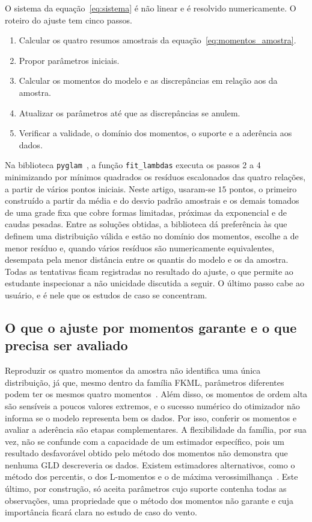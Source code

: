 O sistema da equação~\eqref{eq:sistema} é não linear e é resolvido numericamente. O roteiro do ajuste tem cinco passos.
\begin{enumerate}
    \item Calcular os quatro resumos amostrais da equação~\eqref{eq:momentos_amostra}.
    \item Propor parâmetros iniciais.
    \item Calcular os momentos do modelo e as discrepâncias em relação aos da amostra.
    \item Atualizar os parâmetros até que as discrepâncias se anulem.
    \item Verificar a validade, o domínio dos momentos, o suporte e a aderência aos dados.
\end{enumerate}
Na biblioteca \texttt{pyglam}~\cite{pyglam}, a função \texttt{fit\_lambdas} executa os passos 2 a 4 minimizando por mínimos quadrados os resíduos escalonados das quatro relações, a partir de vários pontos iniciais. Neste artigo, usaram-se $15$ pontos, o primeiro construído a partir da média e do desvio padrão amostrais e os demais tomados de uma grade fixa que cobre formas limitadas, próximas da exponencial e de caudas pesadas. Entre as soluções obtidas, a biblioteca dá preferência às que definem uma distribuição válida e estão no domínio dos momentos, escolhe a de menor resíduo e, quando vários resíduos são numericamente equivalentes, desempata pela menor distância entre os quantis do modelo e os da amostra. Todas as tentativas ficam registradas no resultado do ajuste, o que permite ao estudante inspecionar a não unicidade discutida a seguir. O último passo cabe ao usuário, e é nele que os estudos de caso se concentram.

\subsection{O que o ajuste por momentos garante e o que precisa ser avaliado}

Reproduzir os quatro momentos da amostra não identifica uma única distribuição, já que, mesmo dentro da família FKML, parâmetros diferentes podem ter os mesmos quatro momentos~\cite{karian2011}. Além disso, os momentos de ordem alta são sensíveis a poucos valores extremos, e o sucesso numérico do otimizador não informa se o modelo representa bem os dados. Por isso, conferir os momentos e avaliar a aderência são etapas complementares. A flexibilidade da família, por sua vez, não se confunde com a capacidade de um estimador específico, pois um resultado desfavorável obtido pelo método dos momentos não demonstra que nenhuma GLD descreveria os dados. Existem estimadores alternativos, como o método dos percentis, o dos L-momentos e o de máxima verossimilhança~\cite{karian2011,su2007}. Este último, por construção, só aceita parâmetros cujo suporte contenha todas as observações, uma propriedade que o método dos momentos não garante e cuja importância ficará clara no estudo de caso do vento.
